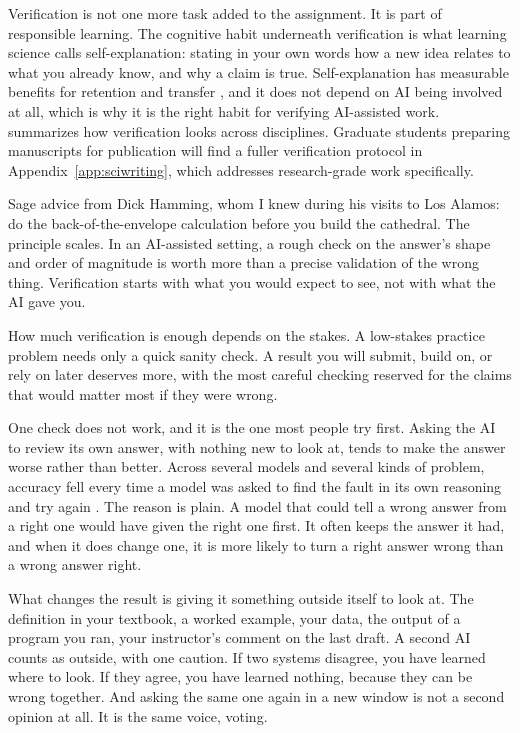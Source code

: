 \documentclass{SIAMbook2023}
\begin{document}
Verification is not one more task added to the assignment. It is part of responsible learning. The cognitive habit underneath verification is what learning science calls self-explanation: stating in your own words how a new idea relates to what you already know, and why a claim is true. Self-explanation has measurable benefits for retention and transfer \citep{dunlosky2013improving}, and it does not depend on AI being involved at all, which is why it is the right habit for verifying AI-assisted work.  summarizes how verification looks across disciplines. Graduate students preparing manuscripts for publication will find a fuller verification protocol in Appendix~\ref{app:sciwriting}, which addresses research-grade work specifically.

Sage advice from Dick Hamming, whom I knew during his visits to Los Alamos: do the back-of-the-envelope calculation before you build the cathedral. The principle scales. In an AI-assisted setting, a rough check on the answer's shape and order of magnitude is worth more than a precise validation of the wrong thing. Verification starts with what you would expect to see, not with what the AI gave you.

How much verification is enough depends on the stakes. A low-stakes practice problem needs only a quick sanity check. A result you will submit, build on, or rely on later deserves more, with the most careful checking reserved for the claims that would matter most if they were wrong.

One check does not work, and it is the one most people try first. Asking the AI to review its own answer, with nothing new to look at, tends to make the answer worse rather than better. Across several models and several kinds of problem, accuracy fell every time a model was asked to find the fault in its own reasoning and try again \citep{huang2024large}. The reason is plain. A model that could tell a wrong answer from a right one would have given the right one first. It often keeps the answer it had, and when it does change one, it is more likely to turn a right answer wrong than a wrong answer right.

What changes the result is giving it something outside itself to look at. The definition in your textbook, a worked example, your data, the output of a program you ran, your instructor's comment on the last draft. A second AI counts as outside, with one caution. If two systems disagree, you have learned where to look. If they agree, you have learned nothing, because they can be wrong together. And asking the same one again in a new window is not a second opinion at all. It is the same voice, voting.
\end{document}
